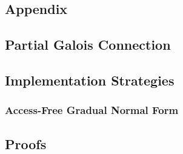 \begin{appendices}
\chapter{Appendix}

\section{Partial Galois Connection}
\label{app:part-galois}


\section{Implementation Strategies}
\label{app:impl-strat}


\subsection{Access-Free Gradual Normal Form}
\label{ssec:gradual-normal-form}


\section{Proofs}
\label{sec:proofs}


\end{appendices}

\begin{comment}
\chapter{UNSORTED}

\section{NPC formula}
\label{sec:npc-formula}

\end{comment}